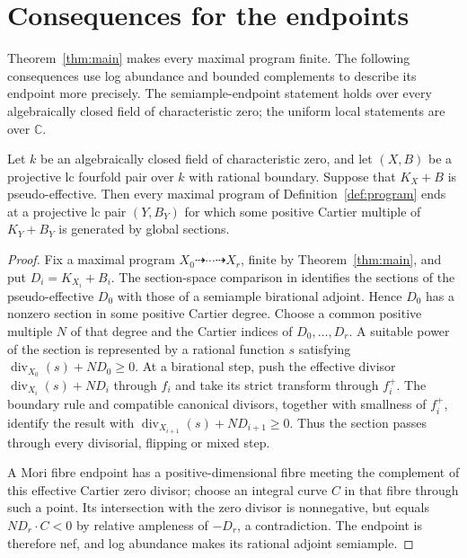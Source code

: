 \section{Consequences for the endpoints}
\label{sec:endpoints}

Theorem~\ref{thm:main} makes every maximal program finite.  The following
consequences use log abundance and bounded complements to describe its
endpoint more precisely.  The semiample-endpoint statement holds over
every algebraically closed field of characteristic zero; the uniform
local statements are over $\mathbb C$.

\begin{corollary}\label{cor:semiample-endpoints}
Let $k$ be an algebraically closed field of characteristic zero, and let
$(X,B)$ be a projective lc fourfold pair over $k$ with rational boundary.
Suppose that $K_X+B$ is pseudo-effective. Then every maximal program of
Definition~\ref{def:program} ends at a projective lc pair $(Y,B_Y)$ for
which some positive Cartier multiple of $K_Y+B_Y$ is generated by global
sections.
\end{corollary}
\begin{proof}
Fix a maximal program $X_0\dashrightarrow\cdots\dashrightarrow X_r$, finite
by Theorem~\ref{thm:main}, and put $D_i=K_{X_i}+B_i$.
The section-space comparison in
\cite[proof of Corollary~12.1(i)]{OpenAILogAbundance2026}
identifies the sections of the pseudo-effective $D_0$ with those of a
semiample birational adjoint.  Hence $D_0$ has a nonzero section in some
positive Cartier degree.  Choose a common positive multiple $N$ of that
degree and the Cartier indices of $D_0,\ldots,D_r$.  A suitable power of
the section is represented by a rational function $s$ satisfying
$\operatorname{div}_{X_0}(s)+ND_0\geq0$.  At a birational step, push the
effective divisor $\operatorname{div}_{X_i}(s)+ND_i$ through
$f_i$ and take its strict transform through $f_i^+$. The boundary rule and
compatible canonical divisors, together with smallness of $f_i^+$, identify
the result with $\operatorname{div}_{X_{i+1}}(s)+ND_{i+1}\geq0$. Thus the
section passes through every divisorial, flipping or mixed step.

A Mori fibre endpoint has a positive-dimensional fibre meeting the complement
of this effective Cartier zero divisor; choose an integral curve $C$ in that
fibre through such a point. Its intersection with the zero divisor is
nonnegative, but equals $ND_r\cdot C<0$ by relative ampleness of $-D_r$, a
contradiction. The endpoint is therefore nef, and log abundance
\cite[Theorem~1.1]{OpenAILogAbundance2026} makes its rational adjoint semiample.
\end{proof}


